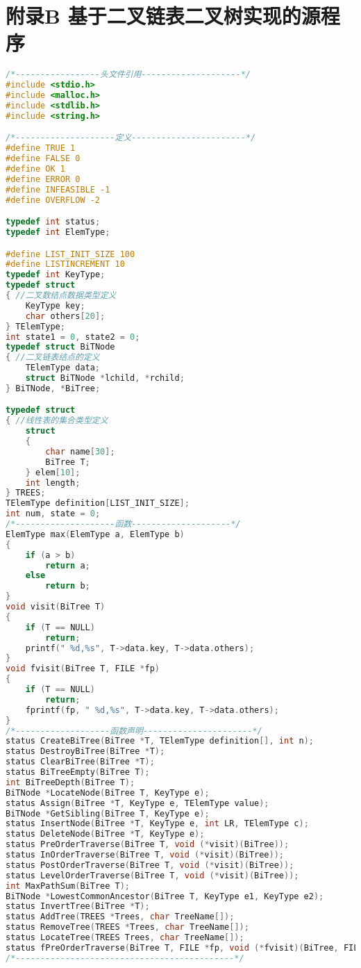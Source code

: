 \documentclass[supercite]{Experimental_Report}
\theoremstyle{definition}
\begin{document}
\section{附录B 基于二叉链表二叉树实现的源程序}
\begin{lstlisting}[language=C]
/*-----------------头文件引用--------------------*/
#include <stdio.h>
#include <malloc.h>
#include <stdlib.h>
#include <string.h>

/*--------------------定义-----------------------*/
#define TRUE 1
#define FALSE 0
#define OK 1
#define ERROR 0
#define INFEASIBLE -1
#define OVERFLOW -2

typedef int status;
typedef int ElemType;

#define LIST_INIT_SIZE 100
#define LISTINCREMENT 10
typedef int KeyType;
typedef struct
{ //二叉数结点数据类型定义
	KeyType key;
	char others[20];
} TElemType;
int state1 = 0, state2 = 0;
typedef struct BiTNode
{ //二叉链表结点的定义
	TElemType data;
	struct BiTNode *lchild, *rchild;
} BiTNode, *BiTree;

typedef struct
{ //线性表的集合类型定义
	struct
	{
		char name[30];
		BiTree T;
	} elem[10];
	int length;
} TREES;
TElemType definition[LIST_INIT_SIZE];
int num, state = 0;
/*--------------------函数--------------------*/
ElemType max(ElemType a, ElemType b)
{
	if (a > b)
		return a;
	else
		return b;
}
void visit(BiTree T)
{
	if (T == NULL)
		return;
	printf(" %d,%s", T->data.key, T->data.others);
}
void fvisit(BiTree T, FILE *fp)
{
	if (T == NULL)
		return;
	fprintf(fp, " %d,%s", T->data.key, T->data.others);
}
/*-------------------函数声明----------------------*/
status CreateBiTree(BiTree *T, TElemType definition[], int n);
status DestroyBiTree(BiTree *T);
status ClearBiTree(BiTree *T);
status BiTreeEmpty(BiTree T);
int BiTreeDepth(BiTree T);
BiTNode *LocateNode(BiTree T, KeyType e);
status Assign(BiTree *T, KeyType e, TElemType value);
BiTNode *GetSibling(BiTree T, KeyType e);
status InsertNode(BiTree *T, KeyType e, int LR, TElemType c);
status DeleteNode(BiTree *T, KeyType e);
status PreOrderTraverse(BiTree T, void (*visit)(BiTree));
status InOrderTraverse(BiTree T, void (*visit)(BiTree));
status PostOrderTraverse(BiTree T, void (*visit)(BiTree));
status LevelOrderTraverse(BiTree T, void (*visit)(BiTree));
int MaxPathSum(BiTree T);
BiTNode *LowestCommonAncestor(BiTree T, KeyType e1, KeyType e2);
status InvertTree(BiTree *T);
status AddTree(TREES *Trees, char TreeName[]);
status RemoveTree(TREES *Trees, char TreeName[]);
status LocateTree(TREES Trees, char TreeName[]);
status fPreOrderTraverse(BiTree T, FILE *fp, void (*fvisit)(BiTree, FILE *));
/*--------------------------------------------*/


\end{lstlisting}
\end{document}
